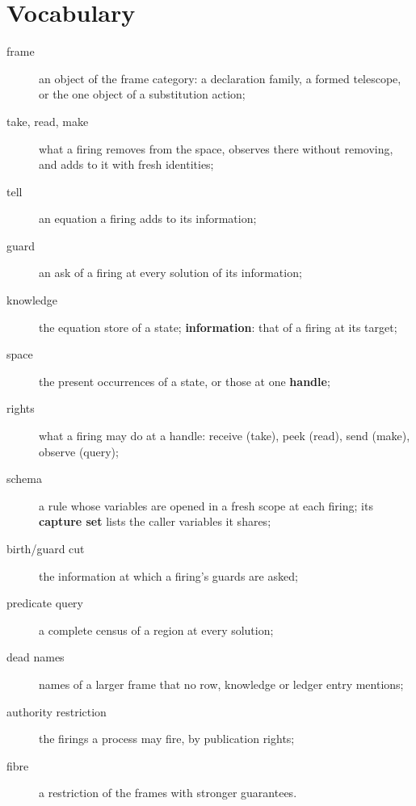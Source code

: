 \documentclass[11pt]{article}
\theoremstyle{remark}
\newcommand{\mt}[1]{{\ttfamily\frenchspacing #1}}
\begin{document}
\section*{Vocabulary}
\begin{description}
\item[frame] an object of the frame category: a declaration family, a formed telescope, or the one
  object of a substitution action;
\item[take, read, make] what a firing removes from the space, observes there without removing, and
  adds to it with fresh identities;
\item[tell] an equation a firing adds to its information;
\item[guard] an ask of a firing at every solution of its information;
\item[knowledge] the equation store of a state; \textbf{information}: that of a firing at its target;
\item[space] the present occurrences of a state, or those at one \textbf{handle};
\item[rights] what a firing may do at a handle: \mt{receive} (take), \mt{peek} (read), \mt{send}
  (make), \mt{observe} (query);
\item[schema] a rule whose variables are opened in a fresh scope at each firing; its \textbf{capture
  set} lists the caller variables it shares;
\item[birth/guard cut] the information at which a firing's guards are asked;
\item[predicate query] a complete census of a region at every solution;
\item[dead names] names of a larger frame that no row, knowledge or ledger entry mentions;
\item[authority restriction] the firings a process may fire, by publication rights;
\item[fibre] a restriction of the frames with stronger guarantees.
\end{description}
\end{document}
